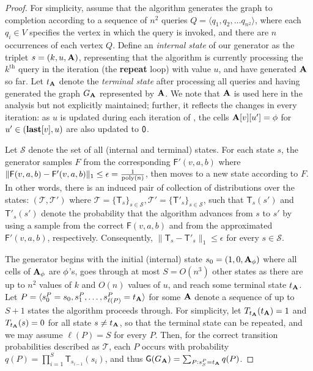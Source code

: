 \begin{proof}
\label{proof:transition}
For simplicity, assume that the algorithm generates the graph to completion according to a sequence of $n^2$  queries $Q = \langle q_1, q_2, \ldots q_{n^2}\rangle$, where each $q_i \in V$ specifies the vertex in which the query  is invoked, and there are $n$ occurrences of each vertex $Q$. Define an \emph{internal state} of our generator as the triplet $s = (k, u, \mathbf{A})$, representing that the algorithm is currently processing the $k^\textrm{th}$  query in the iteration (the \textbf{repeat} loop) with value $u$, and have generated $\mathbf{A}$ so far. Let $t_{\mathbf{A}}$ denote the \emph{terminal state} after processing all queries and having generated the graph $G_{\mathbf{A}}$ represented by $\mathbf{A}$. We note that $\mathbf{A}$ is used here in the analysis but not explicitly maintained; further, it reflects the changes in every iteration: as $u$ is updated during each iteration of , the cells $\mathbf{A}[v][u'] = \phi$ for $u' \in (\mathbf{last}[v],u)$ are also updated to $\mathsf{0}$.

Let $\mathcal{S}$ denote the set of all (internal and terminal) states. For each state $s$, the generator samples $F$ from the corresponding $\mathsf{F}'(v,a,b)$ where $\|\mathsf{F}(v,a,b)-\mathsf{F}'(v,a,b)\|_1 \leq \epsilon = \frac{1}{\mathrm{poly}(n)}$, then moves to a new state according to $F$. In other words, there is an induced pair of collection of distributions over the states: $(\mathcal{T},\mathcal{T}')$ where $\mathcal{T}=\{\mathsf{T}_s\}_{s\in\mathcal{S}}, \mathcal{T}'=\{\mathsf{T}'_s\}_{s\in\mathcal{S}}$, such that $\mathsf{T}_s(s')$ and $\mathsf{T}'_s(s')$ denote the probability that the algorithm advances from $s$ to $s'$ by using a sample from the correct $\mathsf{F}(v,a,b)$ and from the approximated $\mathsf{F}'(v,a,b)$, respectively. Consequently, $\|\mathsf{T}_s-\mathsf{T}'_s\|_1 \leq \epsilon$ for every $s\in\mathcal{S}$.

The generator begins with the initial (internal) state $s_0 = (1, 0, \mathbf{A}_\phi)$ where all cells of $\mathbf{A}_\phi$ are $\phi$'s, goes through at most $S=O(n^3)$ other states as there are up to $n^2$ values of $k$ and $O(n)$ values of $u$, and reach some terminal state $t_{\mathbf{A}}$. Let $P = \langle s^P_0 = s_0, s^P_1, \ldots, s^P_{\ell(P)} = t_{\mathbf{A}} \rangle$ for some $\mathbf{A}$ denote a sequence of up to $S+1$ states the algorithm proceeds through. For simplicity, let $T_{t_{\mathbf{A}}}(t_{\mathbf{A}})=1$ and $T_{t_{\mathbf{A}}}(s)=0$ for all state $s \neq t_{\mathbf{A}}$, so that the terminal state can be repeated, and we may assume $\ell(P) = S$ for every $P$. Then, for the correct transition probabilities described as $\mathcal{T}$, each $P$ occurs with probability $q(P) = \prod_{i=1}^{S} \mathsf{T}_{s_{i-1}}(s_i)$, and thus $\mathsf{G}(G_{\mathbf{A}}) = \sum_{P:s^P_{S} = t_{\mathbf{A}}} q(P)$.


\end{proof}

